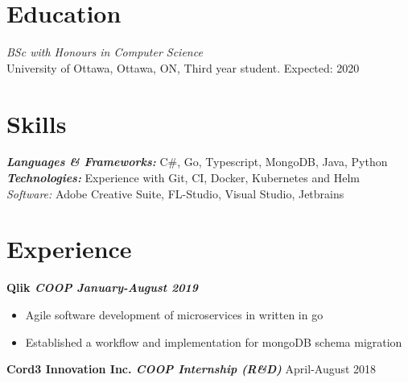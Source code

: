 \documentclass[margin, 10pt]{res} %
\begin{document}
\begin{resume}


\section{Education}

{\sl BSc with Honours in Computer Science}\\
University of Ottawa, Ottawa, ON, Third year student. Expected: 2020



\section{Skills} 

{\textbf{\sl Languages \& Frameworks:}} C\#, Go, Typescript, MongoDB, Java, Python\\
{\textbf{\sl Technologies:}} Experience with Git, CI, Docker, Kubernetes and Helm\\
{\sl Software:} Adobe Creative Suite, FL-Studio, Visual Studio, Jetbrains

 
\section{Experience}

{\bf {Qlik} \sl{COOP} \hfill January-August 2019}
\begin{itemize} \itemsep -2pt
    \item Agile software development of microservices in written in go
    \item Established a workflow and implementation for mongoDB schema migration
\end{itemize}

{\bf Cord3 Innovation Inc. \sl COOP Internship (R\&D)} \hfill April-August 2018 


\end{resume}
\end{document}
